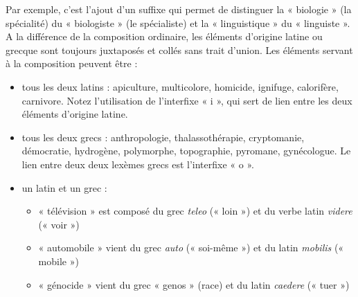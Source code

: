 Par exemple, c’est l’ajout d’un suffixe qui permet de distinguer la « biologie » (la spécialité) du « biologiste » (le spécialiste) et la « linguistique » du « linguiste ». A la différence de la composition ordinaire, les éléments d’origine latine ou grecque sont toujours juxtaposés et collés sans trait d’union. Les éléments servant à la composition peuvent être :
\begin{itemize}
\item tous les deux latins : apiculture, multicolore, homicide, ignifuge, calorifère, carnivore. Notez l’utilisation de l’interfixe « i », qui sert de lien entre les deux éléments d’origine latine.
\item tous les deux grecs : anthropologie, thalassothérapie, cryptomanie, démocratie, hydrogène, polymorphe, topographie, pyromane, gynécologue. Le lien entre deux deux lexèmes grecs est l’interfixe « o ».
\item un latin et un grec :
\begin{itemize}
\item « télévision » est composé du grec \textit{teleo} (« loin ») et du verbe latin \textit{videre} (« voir »)
\item « automobile » vient du grec \textit{auto} (« soi-même ») et du latin \textit{mobilis} (« mobile »)
\item « génocide » vient du grec « genos » (race) et du latin \textit{caedere} (« tuer »)
\end{itemize}
\end{itemize}

